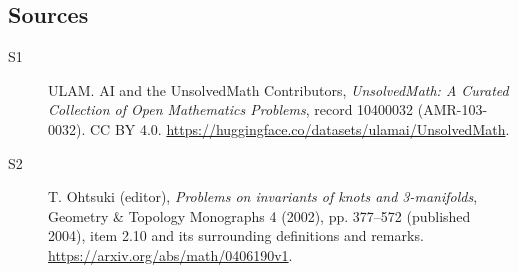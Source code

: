 \documentclass[11pt]{article}
\begin{document}
\subsection{Sources}
\begin{description}
\item[\hypertarget{source:10400032:1}{S1}] ULAM. AI and the UnsolvedMath Contributors, \emph{UnsolvedMath: A Curated Collection of Open Mathematics Problems}, record 10400032 (AMR-103-0032). CC BY 4.0. \url{https://huggingface.co/datasets/ulamai/UnsolvedMath}.
\item[\hypertarget{source:10400032:2}{S2}] T. Ohtsuki (editor), \emph{Problems on invariants of knots and 3-manifolds}, Geometry \& Topology Monographs 4 (2002), pp. 377--572 (published 2004), item 2.10 and its surrounding definitions and remarks. \url{https://arxiv.org/abs/math/0406190v1}.
\end{description}
\label{end:10400032}
\end{document}
